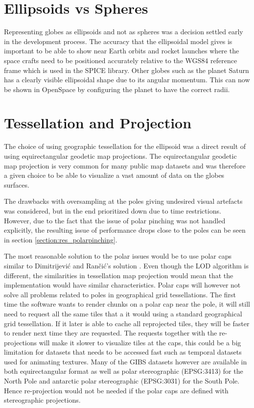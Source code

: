 \section{Ellipsoids vs Spheres}
Representing globes as ellipsoids and not as spheres was a decision settled early in the development process. 
The accuracy that the ellipsoidal model gives is important to be able to show near Earth orbits and rocket launches where the space crafts need to be positioned accurately relative to the WGS84 reference frame which is used in the SPICE library. 
Other globes such as the planet Saturn has a clearly visible ellipsoidal shape due to its angular momentum. This can now be shown in OpenSpace by configuring the planet to have the correct radii.

\section{Tessellation and Projection}
The choice of using geographic tessellation for the ellipsoid was a direct result of using equirectangular geodetic map projections. 
The equirectangular geodetic map projection is very common for many public map datasets and was therefore a given choice to be able to visualize a vast amount of data on the globes surfaces.

The drawbacks with oversampling at the poles giving undesired visual artefacts was considered, but in the end prioritized down due to time restrictions. However, due to the fact that the issue of polar pinching was not handled explicitly, the resulting issue of performance drops close to the poles can be seen in section \ref{section:res_polarpinching}.

The most reasonable solution to the polar issues would be to use polar caps similar to Dimitrijevi\'{c} and Ran\v{c}i\'{c}'s solution \cite{dimi15}. Even though the LOD algorithm is different, the similarities in tessellation map projection would mean that the implementation would have similar characteristics. Polar caps will however not solve all problems related to poles in geographical grid tessellations. The first time the software wants to render chunks on a polar cap near the pole, it will still need to request all the same tiles that a it would using a standard geographical grid tessellation. If it later is able to cache all reprojected tiles, they will be faster to render next time they are requested. The requests together with the re-projections will make it slower to visualize tiles at the caps, this could be a big limitation for datasets that needs to be accessed fast such as temporal datasets used for animating textures. Many of the GIBS datasets however are available in both equirectangular format as well as polar stereographic (EPSG:3413) for the North Pole and antarctic polar stereographic (EPSG:3031) for the South Pole. Hence re-projection would not be needed if the polar caps are defined with stereographic projections. 

